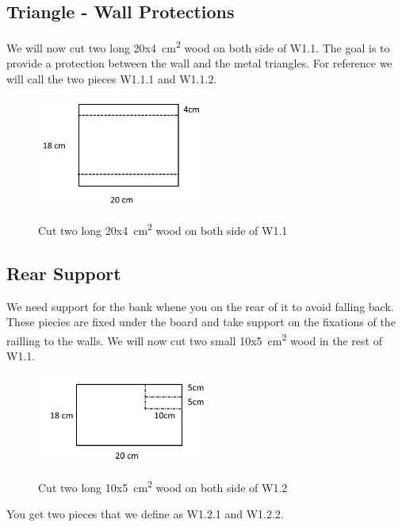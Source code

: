 \documentclass{subfiles}
\begin{document}
    \subsection*{Triangle - Wall Protections}
    We will now cut two long 20x4\SI{}{\square\centi\meter} wood on both side of W1.1. The goal is to 
    provide a protection between the wall and the metal triangles. For reference we will call the two pieces W1.1.1 and W1.1.2.
    \begin{figure}[h]
        \centering
        \includegraphics[width=0.5\textwidth]{Ressources/Cut_W1_1.png}
        \label{fig:Cut_W1_1}
        \caption{Cut two long 20x4\SI{}{\square\centi\meter} wood on both side of W1.1}
    \end{figure}

    \subsection*{Rear Support}
    We need support for the bank whene you on the rear of it to avoid falling back. 
    These piecies are fixed under the board and take support on the fixations of the railling to the walls. 
    We will now cut two small 10x5\SI{}{\square\centi\meter} wood in the rest of W1.1.
    \begin{figure}[h]
        \centering
        \includegraphics[width=0.5\textwidth]{Ressources/Cut_W1_2.png}
        \label{fig:Cut_W1_2}
        \caption{Cut two long 10x5\SI{}{\square\centi\meter} wood on both side of W1.2}
    \end{figure}
    You get two pieces that we define as W1.2.1 and W1.2.2.
\end{document}
